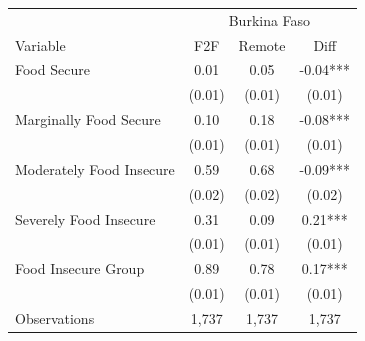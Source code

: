 \begin{tabular}{l*{3}c}
\hline\hline
 & \multicolumn{3}{c}{Burkina Faso}\\ 
Variable & F2F & Remote & Diff \\
\hline
Food Secure&0.01&0.05&-0.04***\\
&(0.01)&(0.01)&(0.01)\\
Marginally Food Secure&0.10&0.18&-0.08***\\
&(0.01)&(0.01)&(0.01)\\
Moderately Food Insecure&0.59&0.68&-0.09***\\
&(0.02)&(0.02)&(0.02)\\
Severely Food Insecure&0.31&0.09&0.21***\\
&(0.01)&(0.01)&(0.01)\\
Food Insecure Group&0.89&0.78&0.17***\\
&(0.01)&(0.01)&(0.01)\\
\hline
Observations & 1,737 & 1,737 & 1,737 \\
\hline\hline
\end{tabular}
